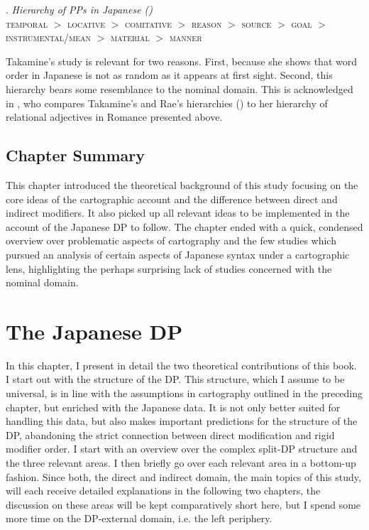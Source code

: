 \documentclass [output=book,colorlinks,citecolor=brown]{langscibook}
\begin{document}
\ex. \emph {Hierarchy of PPs in Japanese (\citealt[94]{takamine:2010:hierarchy})}\\
\textsc{temporal} $>$ \textsc{locative} $>$ \textsc{comitative} $>$ \textsc{reason} $>$ \textsc{source} $>$ \textsc{goal} $>$ \textsc{instrumental}/\textsc{mean} $>$ \textsc{material} $>$ \textsc{manner}

Takamine’s study is relevant for two reasons. First, because she shows that word order in Japanese is not as random as it appears at first sight. Second, this hierarchy bears some resemblance to the nominal domain. This is acknowledged in \citet{bortolotto:2016:RA}, who compares Takamine's and Rae's hierarchies (\citeyear{rae:2010:ordering}) to her hierarchy of relational adjectives in Romance presented above. %

\section{Chapter Summary}

This chapter introduced the theoretical background of this study focusing on the core ideas of the cartographic account and the difference between direct and indirect modifiers. It also picked up all relevant ideas to be implemented in the account of the Japanese DP to follow. The chapter ended with a quick, condensed overview over problematic aspects of cartography and the few studies which pursued an analysis of certain aspects of Japanese syntax under a cartographic lens, highlighting the perhaps surprising lack of studies concerned with the nominal domain.

\chapter{The Japanese DP} \label{theoreticalassumptions}

In this chapter, I present in detail the two theoretical contributions of this book. I start out with the structure of the DP. This structure, which I assume to be universal, is in line with the assumptions in cartography outlined in the preceding chapter, but enriched with the Japanese data. It is not only better suited for handling this data, but also makes important predictions for the structure of the DP, abandoning the strict connection between direct modification and rigid modifier order. I start with an overview over the complex split-DP structure and the three relevant areas. I then briefly go over each relevant area in a bottom-up fashion. Since both, the direct and indirect domain, the main topics of this study, will each receive detailed explanations in the following two chapters, the discussion on these areas will be kept comparatively short here, but I spend some more time on the DP-external domain, i.e. the left periphery.
\end{document}
